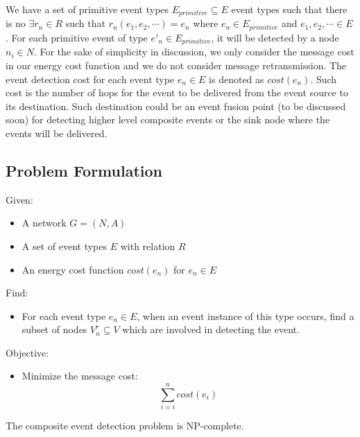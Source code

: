 We have a set of primitive event types \(E_{primitive}\subseteq E\) event types such that there is no \(\exists r_n\in R\) such that \(r_n(e_1, e_2, \cdots)=e_n\) where \(e_n\in E_{primitive}\) and \(e_1, e_2, \cdots \in E\). For each primitive event of type \(e'_n\in E_{primitive}\), it will be detected by a node \(n_i\in N\). For the sake of simplicity in discussion, we only consider the message cost in our energy cost function and we do not consider message retransmission. The event detection cost for each event type \(e_n\in E\) is denoted as \(cost(e_n)\). Such cost is the number of hops for the event to be delivered from the event source to its destination. Such destination could be an event fusion point (to be discussed soon) for detecting higher level composite events or the sink node where the events will be delivered.

\subsection{Problem Formulation}
Given:
\begin{itemize}
	\item A network \(G=(N, A)\)
	\item A set of event types \(E\) with relation \(R\)
	\item An energy cost function \(cost(e_n)\) for \(e_n\in E\)
\end{itemize}

Find:
\begin{itemize}
	\item For each event type \(e_n\in E\), when an event instance of this type occurs, find a subset of nodes \(V_n^r\subseteq V\) which are involved in detecting the event.
\end{itemize}

Objective:
\begin{itemize}
	\item Minimize the message cost:
	\begin{displaymath}
	\sum_{i=i}^{n}cost(e_i)
	\end{displaymath}
\end{itemize}

\begin{theorem}
\label{thm:tableConstruction}
The composite event detection problem is NP-complete.
\end{theorem}

